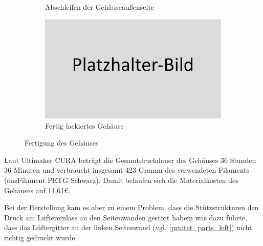 \begin{figure}[h!tb]
\begin{subfigure}[b]{0.5\linewidth}
		\caption[Abschleifen der Gehäuseaußenseite]{Abschleifen der Gehäuseaußenseite}
		\label{fig:filed_parts}
	\end{subfigure}
	\begin{subfigure}[b]{0.5\linewidth}
		\centering
		\includegraphics[width=1\textwidth]{img/placeholder.png}
		\caption[Fertig lackiertes Gehäuse]{Fertig lackiertes Gehäuse}
		\label{fig:finished_parts}
	\end{subfigure}
	\caption[Fertigung des Gehäuses]{Fertigung des Gehäuses}
	\label{fig:creating-case}
\end{figure}\par
Laut Ultimaker CURA beträgt die Gesamtdruckdauer des Gehäuses 36 Stunden 36 Minuten und verbraucht insgesamt 423 Gramm des verwendeten Filaments (dasFilament PETG Schwarz). Damit belaufen sich die Materialkosten des Gehäuses auf 11,61\euro{}.
\par
Bei der Herstellung kam es aber zu einem Problem, dass die Stützstrukturen den Druck am Lüftereinlass an den Seitenwänden gestört habem was dazu führte, dass das Lüftergitter an der  linken Seitenwand (vgl. \ref{printet_parts_left}) nicht richtig gedruckt wurde.